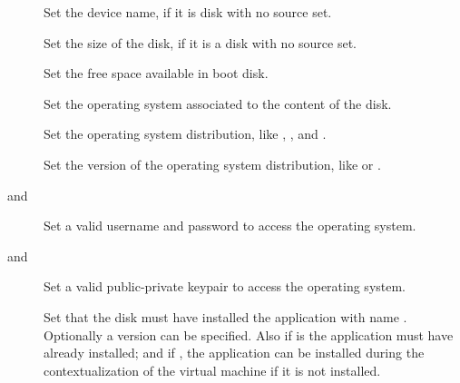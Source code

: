 \documentclass[letterpaper,10pt,english]{sphinxmanual}
\begin{document}
\begin{description}
\item[{}] \leavevmode
Set the device name, if it is disk with no source set.

\item[{}] \leavevmode
Set the size of the disk, if it is a disk with no source set.

\item[{}] \leavevmode
Set the free space available in boot disk.

\item[{}] \leavevmode
Set the operating system associated to the content of the disk.

\item[{}] \leavevmode
Set the operating system distribution, like , ,
 and .

\item[{}] \leavevmode
Set the version of the operating system distribution, like  or
.

\item[{ and }] \leavevmode
Set a valid username and password to access the operating system.

\item[{ and }] \leavevmode
Set a valid public-private keypair to access the operating system.

\item[{}] \leavevmode
Set that the disk must have installed the application with name .
Optionally a version can be specified. Also if  is 
the application must have already installed; and if , the application
can be installed during the contextualization of the virtual machine if it
is not installed.

\end{description}
\end{document}
